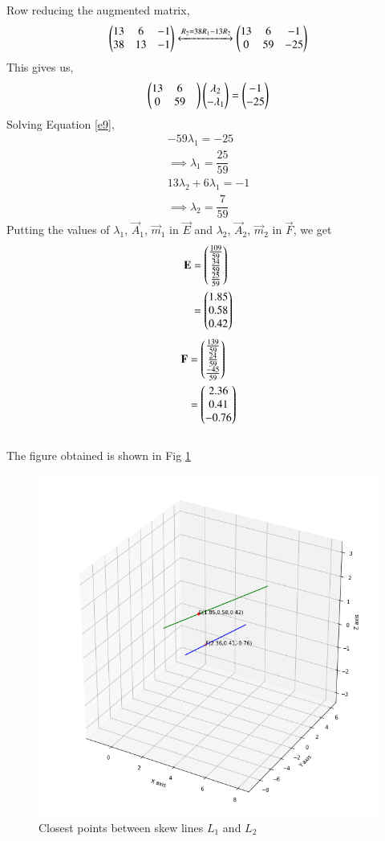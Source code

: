 \documentclass[journal,12pt,twocolumn]{IEEEtran}
\begin{document}
Row reducing the augmented matrix,
\begin{align}
    \begin{pmatrix}13 & 6 & -1\\ 38 & 13 & -1\end{pmatrix}
    \xleftrightarrow[]{R_2=38R_1-13R_2}
    \begin{pmatrix}13 & 6 & -1\\ 0 & 59 & -25\end{pmatrix}
\end{align}
This gives us,
\begin{align}\label{e9}
    \begin{pmatrix}13 & 6 & \\ 0 & 59\end{pmatrix}\begin{pmatrix}\lambda_2 \\ -\lambda_1\end{pmatrix} = \begin{pmatrix}-1 \\ -25\end{pmatrix}
\end{align}
Solving Equation \ref{e9},
\begin{align}\label{e10}
   -59\lambda_1 = -25\\
   \implies\lambda_1 = \dfrac{25}{59}\\
   13\lambda_2 + 6\lambda_1 = -1\\
   \implies\lambda_2 = \dfrac{7}{59}
\end{align}
Putting the values of $\lambda_1$, $\vec{A}_1$, $\vec{m}_1$ in $\vec{E}$ and $\lambda_2$, $\vec{A}_2$, $\vec{m}_2$ in $\vec{F}$, we get
\begin{align}
    \mathbf{E} & = \begin{pmatrix}\frac{109}{59} \\ \frac{34}{59}
    \\ \frac{25}{59}\end{pmatrix}
    \\&=\begin{pmatrix}1.85 \\ 0.58 \\ 0.42\end{pmatrix}
\end{align}
\begin{align}
    \mathbf{F} & = \begin{pmatrix}\frac{139}{59} \\ \frac{24}{59}
    \\ \frac{-45}{59}\end{pmatrix}
    \\&=\begin{pmatrix}2.36 \\ 0.41 \\ -0.76\end{pmatrix}
\end{align}
\\
The figure obtained is shown in Fig \ref{myfig}
\renewcommand{\thefigure}{1}
\begin{figure}[h!]
    \centering
    \includegraphics[width=\columnwidth]{closest.png}
    \caption{Closest points between skew lines $L_1$ and $L_2$}
    \label{myfig}
\end{figure}
\end{document}
